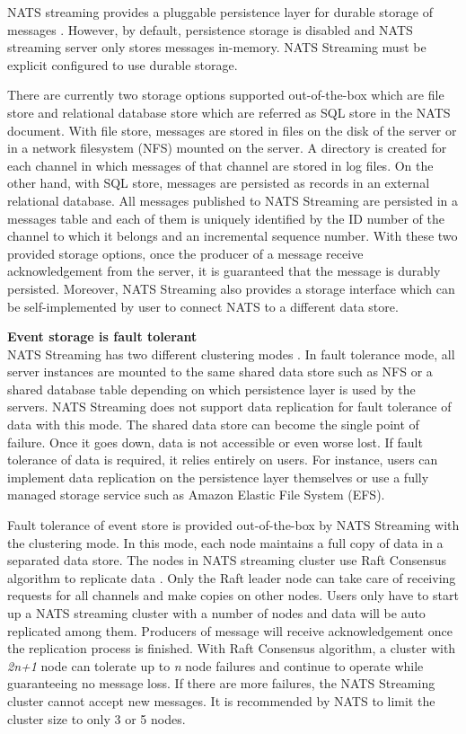 NATS streaming provides a pluggable persistence layer for durable storage of messages \cite{natsconfiguring}. However, by default, persistence storage is disabled and NATS streaming server only stores messages in-memory. NATS Streaming must be explicit configured to use durable storage. 

There are currently two storage options supported out-of-the-box which are file store and relational database store which are referred as SQL store in the NATS document. With file store, messages are stored in files on the disk of the server or in a network filesystem (NFS) mounted on the server. A directory is created for each channel in which messages of that channel are stored in log files. On the other hand, with SQL store, messages are persisted as records in an external relational database. All messages published to NATS Streaming are persisted in a messages table and each of them is uniquely identified by the ID number of the channel to which it belongs and an incremental sequence number. With these two provided storage options, once the producer of a message receive acknowledgement from the server, it is guaranteed that the message is durably persisted. Moreover, NATS Streaming also provides a storage interface which can be self-implemented by user to connect NATS to a different data store. 

\textbf{Event storage is fault tolerant}\\
NATS Streaming has two different clustering modes \cite{natsstreaming}. In fault tolerance mode, all server instances are mounted to the same shared data store such as NFS or a shared database table depending on which persistence layer is used by the servers. NATS Streaming does not support data replication for fault tolerance of data with this mode. The shared data store can become the single point of failure. Once it goes down, data is not accessible or even worse lost. If fault tolerance of data is required, it relies entirely on users. For instance, users can implement data replication on the persistence layer themselves or use a fully managed storage service such as Amazon Elastic File System (EFS). 

Fault tolerance of event store is provided out-of-the-box by NATS Streaming with the clustering mode. In this mode, each node maintains a full copy of data in a separated data store. The nodes in NATS streaming cluster use Raft Consensus algorithm to replicate data \cite{raftalg}. Only the Raft leader node can take care of receiving requests for all channels and make copies on other nodes. Users only have to start up a NATS streaming cluster with a number of nodes and data will be auto replicated among them. Producers of message will receive acknowledgement once the replication process is finished. With Raft Consensus algorithm, a cluster with \emph{2n+1} node can tolerate up to \emph{n} node failures and continue to operate while guaranteeing no message loss. If there are more failures, the NATS Streaming cluster cannot accept new messages. It is recommended by NATS to limit the cluster size to only 3 or 5 nodes.

